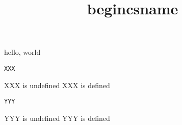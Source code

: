 \documentclass{amsart}
\title{begincsname}
\begin{document}
\maketitle

hello, world

\edef\X{\csname XXX\endcsname}

\texttt{\meaning\X}

\ifx\XXX\undefined
    XXX is undefined
\else
    XXX is defined
\fi

\edef\X{\begincsname YYY\endcsname}

\texttt{\meaning\X}

\ifx\YYY\undefined
    YYY is undefined
\else
    YYY is defined
\fi
\end{document}
